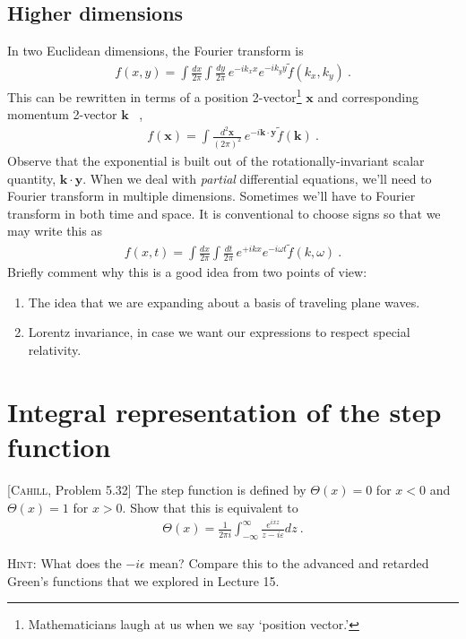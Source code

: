 \documentclass[12pt]{article}
\numberwithin{equation}{section}    %
\renewcommand{\tilde}{\widetilde}   %
\renewcommand{\vec}[1]{\mathbf{#1}} %
\begin{document}
\subsection{Higher dimensions}

In two Euclidean dimensions, the Fourier transform is
\begin{align}
	f(x, y) = \int\frac{dx}{2\pi} \int\frac{dy}{2\pi} \, e^{-ik_xx} e^{-ik_yy} \tilde f(k_x, k_y) \ .
\end{align}
This can be rewritten in terms of a position 2-vector\footnote{Mathematicians laugh at us when we say `position vector.'} $\vec{x}$ and corresponding momentum 2-vector $\vec{k}$ \ , 
\begin{align}
	f(\vec x) = \int\frac{d^2\vec x}{(2\pi)^2}  \, e^{-i\vec k\cdot \vec y} \tilde f(\vec k) \ .
\end{align}
Observe that the exponential is built out of the rotationally-invariant scalar quantity, $\vec k\cdot \vec y$. 
%
When we deal with \emph{partial} differential equations, we'll need to Fourier transform in multiple dimensions. Sometimes we'll have to Fourier transform in both time and space. It is conventional to choose signs so that we may write this as 
\begin{align}
	f(x, t) = \int\frac{dx}{2\pi} \int\frac{dt}{2\pi} \, e^{+ikx} e^{-i\omega t} \tilde f(k, \omega) \ .
\end{align}
Briefly comment why this is a good idea from two points of view:
\begin{enumerate}
	\item The idea that we are expanding about a basis of traveling plane waves. 
	\item Lorentz invariance, in case we want our expressions to respect special relativity.
\end{enumerate}

\section{Integral representation of the step function}

[\textsc{Cahill}, Problem 5.32] 
The step function is defined by $\Theta(x) = 0$ for $x<0$ and $\Theta(x) = 1$ for $x>0$. Show that this is equivalent to
\begin{align}
	\Theta(x) = \frac{1}{2\pi i}\int_{-\infty}^\infty \frac{e^{ixz}}{z-i\varepsilon} dz \ .
\end{align}

\textsc{Hint}: What does the $-i\epsilon$ mean? Compare this to the advanced and retarded Green's functions that we explored in Lecture 15. 
\end{document}
